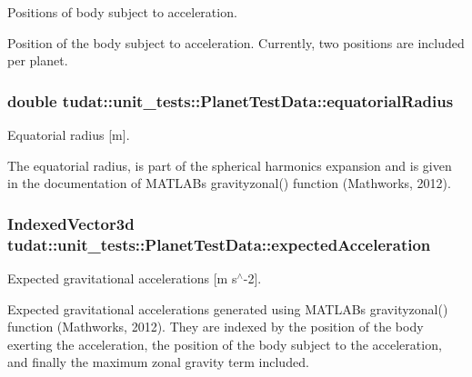 Positions of body subject to acceleration. 

Position of the body subject to acceleration. Currently, two positions are included per planet. 
\subsubsection[{\texorpdfstring{equatorial\+Radius}{equatorialRadius}}]{\setlength{\rightskip}{0pt plus 5cm}double tudat\+::unit\+\_\+tests\+::\+Planet\+Test\+Data\+::equatorial\+Radius}\hypertarget{structtudat_1_1unit__tests_1_1PlanetTestData_a3c4fec8841ffc942e797d9f9904719b3}{}\label{structtudat_1_1unit__tests_1_1PlanetTestData_a3c4fec8841ffc942e797d9f9904719b3}


Equatorial radius \mbox{[}m\mbox{]}. 

The equatorial radius, is part of the spherical harmonics expansion and is given in the documentation of M\+A\+T\+L\+AB\textquotesingle{}s gravityzonal() function (Mathworks, 2012). 
\subsubsection[{\texorpdfstring{expected\+Acceleration}{expectedAcceleration}}]{\setlength{\rightskip}{0pt plus 5cm}Indexed\+Vector3d tudat\+::unit\+\_\+tests\+::\+Planet\+Test\+Data\+::expected\+Acceleration}\hypertarget{structtudat_1_1unit__tests_1_1PlanetTestData_a573ed4ab5516514b60d9da01a1d097f3}{}\label{structtudat_1_1unit__tests_1_1PlanetTestData_a573ed4ab5516514b60d9da01a1d097f3}


Expected gravitational accelerations \mbox{[}m s$^\wedge$-\/2\mbox{]}. 

Expected gravitational accelerations generated using M\+A\+T\+L\+AB\textquotesingle{}s gravityzonal() function (Mathworks, 2012). They are indexed by the position of the body exerting the acceleration, the position of the body subject to the acceleration, and finally the maximum zonal gravity term included. 
